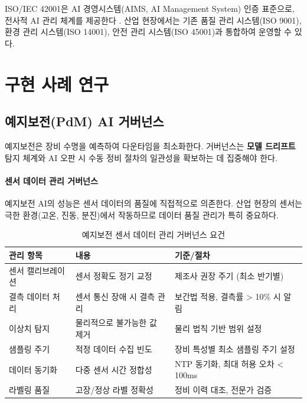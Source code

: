 ISO/IEC 42001은 AI 경영시스템(AIMS, AI Management System) 인증 표준으로, 전사적 AI 관리 체계를 제공한다 \cite{iso42001}. 산업 현장에서는 기존 품질 관리 시스템(ISO 9001), 환경 관리 시스템(ISO 14001), 안전 관리 시스템(ISO 45001)과 통합하여 운영할 수 있다.

\section{구현 사례 연구}
\label{sec:19.3}

\subsection{예지보전(PdM) AI 거버넌스}
\label{sec:19.3.1}

예지보전은 장비 수명을 예측하여 다운타임을 최소화한다. 거버넌스는 \textbf{모델 드리프트} 탐지 체계와 AI 오판 시 수동 정비 절차의 일관성을 확보하는 데 집중해야 한다.

\paragraph{센서 데이터 관리 거버넌스}

예지보전 AI의 성능은 센서 데이터의 품질에 직접적으로 의존한다. 산업 현장의 센서는 극한 환경(고온, 진동, 분진)에서 작동하므로 데이터 품질 관리가 특히 중요하다.

\begin{table}[htbp]
\centering
\caption{예지보전 센서 데이터 관리 거버넌스 요건}
\label{tab:19_sensor_gov}
\begin{tabularx}{\textwidth}{p{2.5cm}Xp{4cm}}
\toprule
\textbf{관리 항목} & \textbf{내용} & \textbf{기준/절차} \\
\midrule
센서 캘리브레이션 & 센서 정확도 정기 교정 & 제조사 권장 주기 (최소 반기별) \\
결측 데이터 처리 & 센서 통신 장애 시 결측 관리 & 보간법 적용, 결측률 > 10\% 시 알림 \\
이상치 탐지 & 물리적으로 불가능한 값 제거 & 물리 법칙 기반 범위 설정 \\
샘플링 주기 & 적정 데이터 수집 빈도 & 장비 특성별 최소 샘플링 주기 설정 \\
데이터 동기화 & 다중 센서 시간 정합성 & NTP 동기화, 최대 허용 오차 < 100ms \\
라벨링 품질 & 고장/정상 라벨 정확성 & 정비 이력 대조, 전문가 검증 \\
\bottomrule
\end{tabularx}
\end{table}

